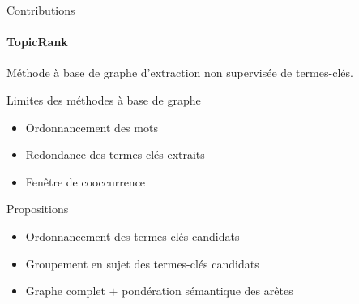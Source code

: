 \begin{frame}{Contributions}\framesubtitle{TopicRank}
  Méthode à base de graphe d'extraction non supervisée de termes-clés.

  \vspace{1em}

  \begin{alertblock}{Limites des méthodes à base de graphe}
    \begin{itemize}
      \item{Ordonnancement des mots}
      \item{Redondance des termes-clés extraits}
      \item{Fenêtre de cooccurrence}
    \end{itemize}
  \end{alertblock}

  \vspace{1em}

  \begin{block}{Propositions}
    \begin{itemize}
      \item{Ordonnancement des termes-clés candidats}
      \item{Groupement en sujet des termes-clés candidats}
      \item{Graphe complet $+$ pondération sémantique des arêtes}
    \end{itemize}
  \end{block}
\end{frame}

